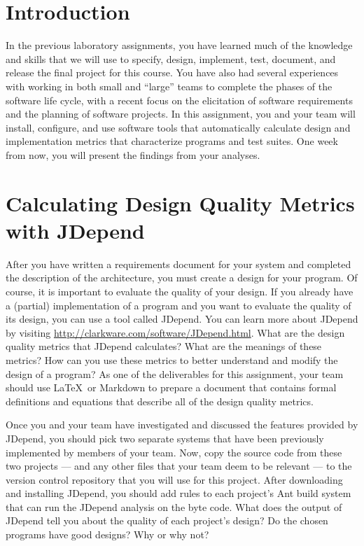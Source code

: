 

\usepackage[compact]{titlesec}



\section*{Introduction}

In the previous laboratory assignments, you have learned much of the knowledge and skills that we will use to specify,
design, implement, test, document, and release the final project for this course.  You have also had several experiences
with working in both small and ``large'' teams to complete the phases of the software life cycle, with a recent focus on
the elicitation of software requirements and the planning of software projects.  In this assignment, you and your team
will install, configure, and use software tools that automatically calculate design and implementation metrics that
characterize programs and test suites.  One week from now, you will present the findings from your analyses.

\section*{Calculating Design Quality Metrics with JDepend}

After you have written a requirements document for your system and completed the description of the architecture, you
must create a design for your program.  Of course, it is important to evaluate the quality of your design.  If you
already have a (partial) implementation of a program and you want to evaluate the quality of its design, you can use a
tool called JDepend.  You can learn more about JDepend by visiting \url{http://clarkware.com/software/JDepend.html}.
What are the design quality metrics that JDepend calculates? What are the meanings of these metrics? How can you use
these metrics to better understand and modify the design of a program? As one of the deliverables for this
assignment, your team should use \LaTeX\ or Markdown to prepare a document that contains formal definitions and
equations that describe all of the design quality metrics.

Once you and your team have investigated and discussed the features provided by JDepend, you should pick two separate
systems that have been previously implemented by members of your team. Now, copy the source code from these two projects
--- and any other files that your team deem to be relevant --- to the version control repository that you will use for
this project.  After downloading and installing JDepend, you should add rules to each project's Ant build system that
can run the JDepend analysis on the byte code. What does the output of JDepend tell you about the quality of each
project's design? Do the chosen programs have good designs? Why or why not?

